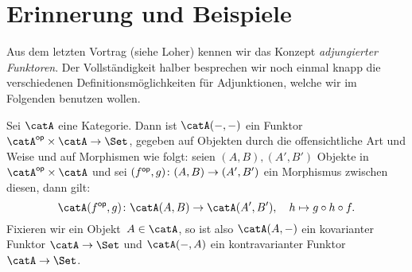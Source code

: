 \chapter{Erinnerung und Beispiele}
Aus dem letzten Vortrag (siehe Loher\cite{talk:loher}) kennen wir das Konzept
\emph{adjungierter Funktoren}. Der Vollständigkeit halber besprechen wir noch
einmal knapp die verschiedenen Definitionsmöglichkeiten für Adjunktionen, welche
wir im Folgenden benutzen wollen.

\begin{thErinnerung}
    Sei $\catA$ eine Kategorie. Dann ist $\catA(\blank,\blank)$ ein Funktor
    $\catA\op\times\catA\to\Set$, gegeben auf Objekten durch die offensichtliche
    Art und Weise und auf Morphismen wie folgt: seien $(A,B),(A',B')$ Objekte
    in $\catA\op\times\catA$ und sei $(f^\mathsf{op},g)\colon (A,B)\to (A',B')$ ein 
    Morphismus zwischen diesen, dann gilt:
    \[ \catA(f\op,g)\colon \catA(A,B)\to \catA(A',B'), \quad 
        h\mapsto g\after h\after f
    . \]
    Fixieren wir ein Objekt~$A\in\catA$, so ist
    also $\catA(A,\blank)$ ein kovarianter Funktor $\catA\to\Set$
    und $\catA(\blank,A)$ ein kontravarianter Funktor $\catA\to\Set$.
\end{thErinnerung}

